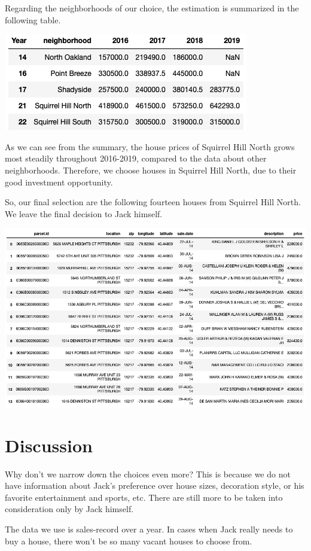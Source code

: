 \documentclass[11pt,notitlepage]{article}
\begin{document}
Regarding the neighborhoods of our choice, the estimation is summarized
in the following table.
\begin{center}
    \includegraphics[scale=0.6]{median_price.png}
\end{center}
As we can see from the summary, the house prices of Squirrel Hill North
grows most steadily throughout 2016-2019,
compared to the data about other neighborhoods.
Therefore, we choose houses in Squirrel Hill North,
due to their good investment opportunity.

So, our final selection are the following fourteen houses
from Squirrel Hill North. We leave the final decision to Jack himself.
\begin{center}
    \includegraphics[scale=0.4]{result.png}
\end{center}

\section{Discussion}
Why don’t we narrow down the choices even more?
This is because we do not have information about Jack’s preference over house sizes,
decoration style, or his favorite entertainment and sports, etc.
There are still more to be taken into consideration only by Jack himself.

The data we use is sales-record over a year.
In cases when Jack really needs to buy a house,
there won’t be so many vacant houses to choose from.
\end{document}

